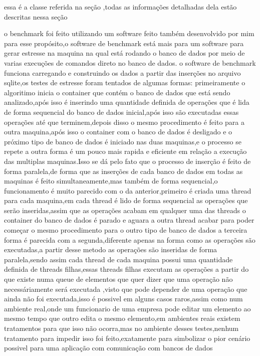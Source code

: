 \documentclass[
	12pt,				%
	openright,			%
	oneside,			%
	a4paper,			%
	english,			%
	french,				%
	spanish,			%
	brazil,				%
	]{abntex2}
\begin{document}
essa é a classe referida na seção ,todas as informações detalhadas dela estão descritas nessa seção

o benchmark foi feito utilizando um software feito também desenvolvido por mim para esse propósito,o software de benchmark está mais para um software para gerar estresse na maquina na qual está rodando o banco de dados por meio de varias execuções de comandos direto no banco de dados.
o software de benchmark funciona carregando e construindo os dados a partir das inserções no arquivo sqlite,os testes de estresse foram tentados de algumas formas:\newline
primeiramente o algoritimo inicia o container que contém o banco de dados que está sendo analizado,após isso é inserindo uma quantidade definida de operações que é lida de forma sequencial do banco de dados inicial,após isso são executadas essas operações até que terminem,depois disso o mesmo procedimento é feito para a outra maquina,após isso o container com o banco de dados é desligado e o próximo tipo de banco de dados é iniciado nas duas maquinas,e o processo se repete\newline
a outra forma é um pouco mais rapida e eficiente em relação a execução das multiplas maquinas.Isso se dá pelo fato que o processo de inserção é feito de forma paralela,de forma que as inserções de cada banco de dados em todas as maquinas é feito simultaneamente,mas também de forma sequencial,o funcionamento é muito parecido com o da anterior,primeiro é criada uma thread para cada maquina,em cada thread é lido de forma sequencial as operações que serão inseridas,assim que as operações acabam em qualquer uma das threads o container do banco de dados é parado e aguara a outra thread acabar para poder começar o mesmo procedimento para o outro tipo de banco de dados\newline
a terceira forma é parecida com a segunda,diferente apenas na forma como as operações são executadas,a partir desse metodo as operações são inseridas de forma paralela,sendo assim cada thread de cada maquina possui uma quantidade definida de threads filhas,essas threads filhas executam as operações a partir do que existe numa queue de elementos que quer dizer que uma operação não necessáriamente será executada ,visto que pode depender de uma operação que ainda não foi executada,isso é possivel em alguns casos raros,assim como num ambiente real,onde um funcionario de uma empresa pode editar um elemento ao mesmo tempo que outro edita o mesmo elemento,em ambientes reais existem tratamentos para que isso não ocorra,mas no ambiente desses testes,nenhum tratamento para impedir isso foi feito,exatamente para simbolizar o pior cenário possivel para uma aplicação com comunicação com bancos de dados\newline
\end{document}
